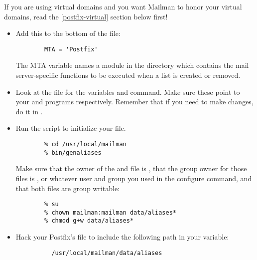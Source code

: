 \documentclass{howto}
\begin{document}
\begin{notice}[note]
If you are using virtual domains and you want Mailman to honor your virtual
domains, read the \ref{postfix-virtual} section below first!
\end{notice}

\begin{itemize}
\item Add this to the bottom of the 
      file:

      \begin{verbatim}
        MTA = 'Postfix'
      \end{verbatim}

      The MTA variable names a module in the  directory
      which contains the mail server-specific functions to be executed when a
      list is created or removed.

\item Look at the  file for the variables
       and  command.  Make sure
      these point to your  and  programs
      respectively.  Remember that if you need to make changes, do it in
      .

\item Run the  script to initialize your
       file.

      \begin{verbatim}
        % cd /usr/local/mailman
        % bin/genaliases
      \end{verbatim}

      Make sure that the owner of the  and
       file is , that the group owner
      for those files is , or whatever user and group you used
      in the configure command, and that both files are group writable:

      \begin{verbatim}
        % su
        % chown mailman:mailman data/aliases*
        % chmod g+w data/aliases*
      \end{verbatim}

\item Hack your Postfix's  file to include the following path in
      your  variable:

      \begin{verbatim}
          /usr/local/mailman/data/aliases
      \end{verbatim}


\end{itemize}
\end{document}
